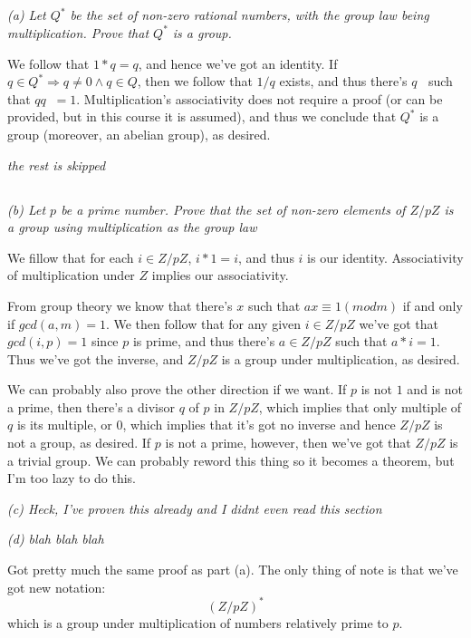 \documentclass[11pt,oneside,titlepage]{book}
\DeclareMathOperator \inv {^{-1}}
\DeclareMathOperator \ra {\Rightarrow}
\begin{document}
\subsection{}

\textit{(a) Let $Q^*$ be the set of non-zero rational numbers, with
  the group law being multiplication. Prove that $Q^*$ is a group.}

We follow that $1 * q = q$, and hence we've got an identity.  If $q
\in Q^* \ra q \neq 0 \land q \in Q$, then we follow that $1/q$ exists,
and thus there's $q\inv$ such that $q q\inv = 1$. Multiplication's
associativity does not require a proof (or can be provided, but in
this course it is assumed), and thus we conclude that $Q^*$ is a group
(moreover, an abelian group), as desired.

\textit{the rest is skipped}

\subsection{}

\textit{(b) Let $p$ be a prime number. Prove that the set of non-zero
  elements of $Z/pZ$ is a group using multiplication as the group law}

We fillow that for each $i \in Z/pZ$, $i * 1 = i$, and thus $i$ is our
identity. Associativity of multiplication under $Z$ implies our associativity.

From group theory we know that there's $x$ such that $ax \equiv 1 (mod
m)$ if and only if $gcd(a, m) = 1$.
We then follow that for any given $i \in Z/pZ$ we've got that
$gcd(i, p) = 1$ since $p$ is prime, and thus there's $a \in Z/pZ$
such that $a * i = 1$. Thus we've got the inverse, and $Z/pZ$ is a
group under multiplication, as desired.

We can probably also prove the other direction if we want. If $p$ is
not $1$ and is not a prime, then there's a divisor $q$ of $p$ in
$Z/pZ$, which implies that only multiple of $q$ is its multiple, or
$0$, which implies that it's got no inverse and hence $Z/pZ$ is not a
group, as desired. If $p$ is not a prime, however, then we've got that
$Z/pZ$ is a trivial group. We can probably reword this thing so it
becomes a theorem, but I'm too lazy to do this.

\textit{(c) Heck, I've proven this already and I didnt even read this section}

\textit{(d) blah blah blah}

Got pretty much the same proof as part (a). The only thing of note is
that we've got new notation:
$$(Z/pZ)^*$$
which is a group under multiplication of numbers relatively prime to $p$.
\end{document}
